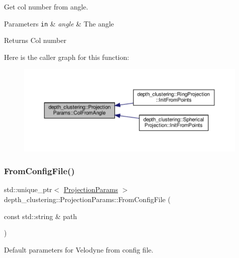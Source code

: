 Get col number from angle. 


\begin{DoxyParams}[1]{Parameters}
\mbox{\tt in}  & {\em angle} & The angle\\
\hline
\end{DoxyParams}
\begin{DoxyReturn}{Returns}
Col number 
\end{DoxyReturn}
Here is the caller graph for this function\+:\nopagebreak
\begin{figure}[H]
\begin{center}
\leavevmode
\includegraphics[width=350pt]{classdepth__clustering_1_1ProjectionParams_a76d3be24f6c166bc5567d622e4a4995b_icgraph}
\end{center}
\end{figure}
\mbox{\label{classdepth__clustering_1_1ProjectionParams_ad58dde41a515eda5871998da5435dc42}} 
\subsubsection{\texorpdfstring{From\+Config\+File()}{FromConfigFile()}}
{\footnotesize\ttfamily std\+::unique\+\_\+ptr$<$ \hyperlink{classdepth__clustering_1_1ProjectionParams}{Projection\+Params} $>$ depth\+\_\+clustering\+::\+Projection\+Params\+::\+From\+Config\+File (\begin{DoxyParamCaption}\item[{const std\+::string \&}]{path }\end{DoxyParamCaption})\hspace{0.3cm}{\ttfamily [static]}}



Default parameters for Velodyne from config file. 

